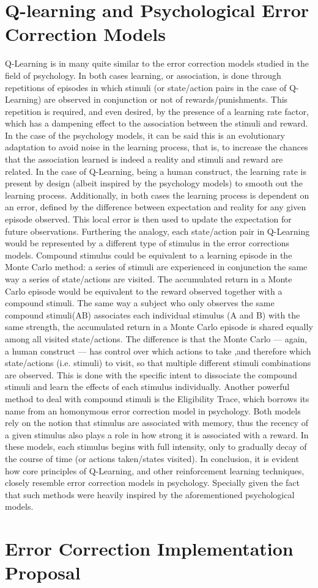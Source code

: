 \documentclass[10pt]{article}
\begin{document}
\section{Q-learning and Psychological Error Correction Models}

Q-Learning is in many quite similar to the error correction models studied in the field of psychology. In both cases learning, or association, is done through repetitions of episodes in which stimuli (or state/action pairs in the case of Q-Learning) are observed in conjunction or not of rewards/punishments. This repetition is required, and even desired, by the presence of a learning rate factor, which has a dampening effect to the association between the stimuli and reward. In the case of the psychology models, it can be said this is an evolutionary adaptation to avoid noise in the learning process, that is, to increase the chances that the association learned is indeed a reality and stimuli and reward are related. In the case of Q-Learning, being a human construct, the learning rate is present by design (albeit inspired by the psychology models) to smooth out the learning process. Additionally, in both cases the learning process is dependent on an error, defined by the difference between expectation and reality for any given episode observed. This local error is then used to update the expectation for future observations. Furthering the analogy, each state/action pair in Q-Learning would be represented by a different type of stimulus in the error corrections models. Compound stimulus could be equivalent to a learning episode in the Monte Carlo method: a series of stimuli are experienced in conjunction the same way a series of state/actions are visited. The accumulated return in a Monte Carlo episode would be equivalent to the reward observed together with a compound stimuli. The same way a subject who only observes the same compound stimuli(AB) associates each individual stimulus (A and B) with the same strength, the accumulated return in a Monte Carlo episode is shared equally among all visited state/actions. The difference is that the Monte Carlo — again, a human construct — has control over which actions to take ,and therefore which state/actions (i.e. stimuli) to visit, so that multiple different stimuli combinations are observed. This is done with the specific intent to dissociate the compound stimuli and learn the effects of each stimulus individually. Another powerful method to deal with compound stimuli is the Eligibility Trace, which borrows its name from an homonymous error correction model in psychology. Both models rely on the notion that stimulus are associated with memory, thus the recency of a given stimulus also plays a role in how strong it is associated with a reward. In these models, each stimulus begins with full intensity, only to gradually decay of the course of time (or actions taken/states visited). In conclusion, it is evident how core principles of Q-Learning, and other reinforcement learning techniques, closely resemble error correction models in psychology. Specially given the fact that such methods were heavily inspired by the aforementioned psychological models.

\section{Error Correction Implementation Proposal}
\end{document}
